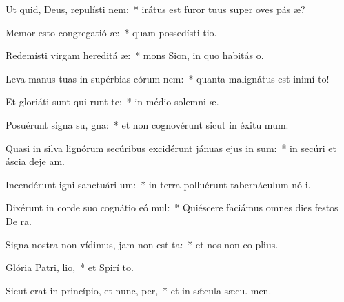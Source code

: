\item Ut quid, Deus, repulísti  nem:~* irátus est furor tuus super oves pás æ?
\item Memor esto congregatió æ:~* quam possedísti  tio.
\item Redemísti virgam hereditá æ:~* mons Sion, in quo habitás  o.
\item Leva manus tuas in supérbias eórum  nem:~* quanta malignátus est inimí  to!
\item Et gloriáti sunt qui runt te:~* in médio solemni æ.
\item Posuérunt signa su, gna:~* et non cognovérunt sicut in éxitu  mum.
\item Quasi in silva lignórum secúribus excidérunt jánuas ejus in sum:~* in secúri et áscia deje am.
\item Incendérunt igni sanctuári um:~* in terra polluérunt tabernáculum nó i.
\item Dixérunt in corde suo cognátio eó mul:~* Quiéscere faciámus omnes dies festos De  ra.
\item Signa nostra non vídimus, jam non est ta:~* et nos non co plius.
\item Glória Patri,  lio,~* et Spirí to.
\item Sicut erat in princípio, et nunc,  per,~* et in sǽcula sæcu. men.

